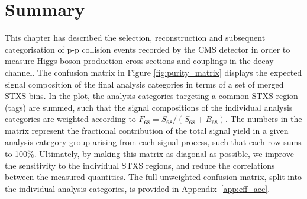 \section{Summary}

This chapter has described the selection, reconstruction and subsequent categorisation of p-p collision events recorded by the CMS detector in order to measure Higgs boson production cross sections and couplings in the \Hgg decay channel. The confusion matrix in Figure \ref{fig:purity_matrix} displays the expected signal composition of the final analysis categories in terms of a set of merged STXS bins. In the plot, the analysis categories targeting a common STXS region (tags) are summed, such that the signal compositions of the individual analysis categories are weighted according to $F_{68}=S_{68}/(S_{68}+B_{68})$. The numbers in the matrix represent the fractional contribution of the total signal yield in a given analysis category group arising from each signal process, such that each row sums to 100\%. Ultimately, by making this matrix as diagonal as possible, we improve the sensitivity to the individual STXS regions, and reduce the correlations between the measured quantities. The full unweighted confusion matrix, split into the individual analysis categories, is provided in Appendix~\ref{app:eff_acc}.

